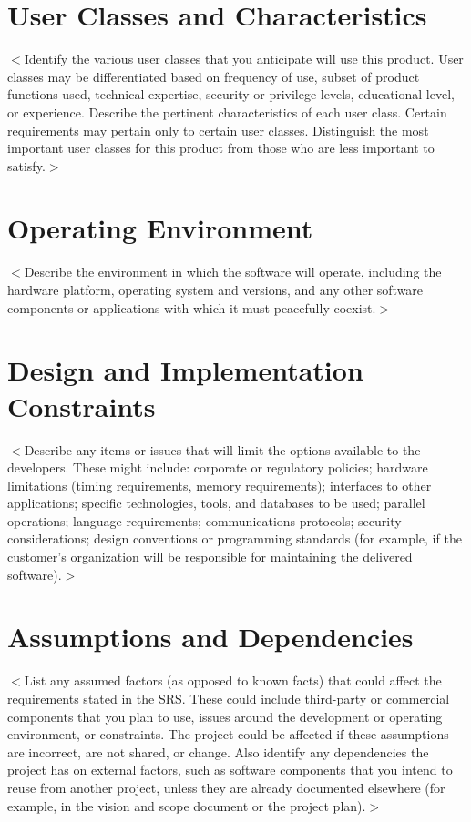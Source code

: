 \documentclass[a4paper, 11pt]{scrreprt}
\begin{document}
\section{User Classes and Characteristics}
$<$Identify the various user classes that you anticipate will use this product.  
User classes may be differentiated based on frequency of use, subset of product 
functions used, technical expertise, security or privilege levels, educational 
level, or experience. Describe the pertinent characteristics of each user class.  
Certain requirements may pertain only to certain user classes. Distinguish the 
most important user classes for this product from those who are less important 
to satisfy.$>$

\section{Operating Environment}
$<$Describe the environment in which the software will operate, including the 
hardware platform, operating system and versions, and any other software 
components or applications with which it must peacefully coexist.$>$ 

\section{Design and Implementation Constraints}
$<$Describe any items or issues that will limit the options available to the 
developers. These might include: corporate or regulatory policies; hardware 
limitations (timing requirements, memory requirements); interfaces to other 
applications; specific technologies, tools, and databases to be used; parallel 
operations; language requirements; communications protocols; security 
considerations; design conventions or programming standards (for example, if the 
customer's organization will be responsible for maintaining the delivered 
software).$>$

\section{Assumptions and Dependencies}
$<$List any assumed factors (as opposed to known facts) that could affect the 
requirements stated in the SRS. These could include third-party or commercial 
components that you plan to use, issues around the development or operating 
environment, or constraints. The project could be affected if these assumptions 
are incorrect, are not shared, or change. Also identify any dependencies the 
project has on external factors, such as software components that you intend to 
reuse from another project, unless they are already documented elsewhere (for 
example, in the vision and scope document or the project plan).$>$
\end{document}
